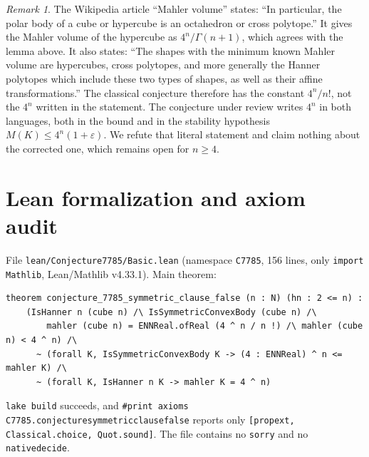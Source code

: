 \documentclass[11pt]{article}
\theoremstyle{definition}
\theoremstyle{remark}
\newtheorem{remark}[theorem]{Remark}
\renewcommand{\_}{\oldus\allowbreak}
\begin{document}
\begin{remark}\label{rem:const}
The Wikipedia article ``Mahler volume'' states: ``In particular, the polar body of a cube or
hypercube is an octahedron or cross polytope.'' It gives the Mahler volume of the hypercube as
$4^n/\Gamma(n+1)$, which agrees with the lemma above. It also states: ``The shapes with the minimum
known Mahler volume are hypercubes, cross polytopes, and more generally the Hanner polytopes which
include these two types of shapes, as well as their affine transformations.'' The classical
conjecture therefore has the constant $4^n/n!$, not the $4^n$ written in the statement. The
conjecture under review writes $4^n$ in both languages, both in the bound and in the stability
hypothesis $M(K)\le4^n(1+\varepsilon)$. We refute that literal statement and claim nothing about the
corrected one, which remains open for $n\ge4$.
\end{remark}

\section{Lean formalization and axiom audit}

File \texttt{lean/Conjecture7785/Basic.lean} (namespace \texttt{C7785}, 156 lines, only
\texttt{import Mathlib}, Lean/Mathlib v4.33.1). Main theorem:
\begin{verbatim}
theorem conjecture_7785_symmetric_clause_false (n : N) (hn : 2 <= n) :
    (IsHanner n (cube n) /\ IsSymmetricConvexBody (cube n) /\
        mahler (cube n) = ENNReal.ofReal (4 ^ n / n !) /\ mahler (cube n) < 4 ^ n) /\
      ~ (forall K, IsSymmetricConvexBody K -> (4 : ENNReal) ^ n <= mahler K) /\
      ~ (forall K, IsHanner n K -> mahler K = 4 ^ n)
\end{verbatim}
\texttt{lake build} succeeds, and \texttt{\#print axioms
C7785.conjecture\_7785\_symmetric\_clause\_false} reports only
\texttt{[propext, Classical.choice, Quot.sound]}. The file contains no \texttt{sorry} and no
\texttt{native\_decide}.
\end{document}

